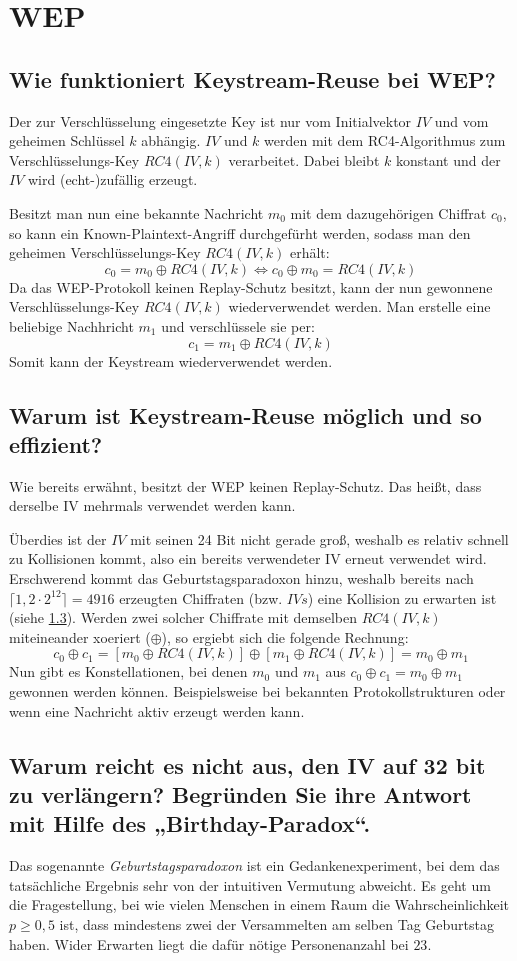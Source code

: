 \section{WEP}
\subsection{Wie funktioniert Keystream-Reuse bei WEP?}
Der zur Verschlüsselung eingesetzte Key ist nur vom Initialvektor $IV$ und vom geheimen Schlüssel $k$ abhängig. $IV$ und $k$ werden mit dem RC4-Algorithmus zum Verschlüsselungs-Key $RC4(IV,k)$ verarbeitet. Dabei bleibt $k$ konstant und der $IV$ wird (echt-)zufällig erzeugt.

Besitzt man nun eine bekannte Nachricht $m_0$ mit dem dazugehörigen Chiffrat $c_0$, so kann ein Known-Plaintext-Angriff durchgefürht werden, sodass man den geheimen Verschlüsselungs-Key $RC4(IV, k)$ erhält:
$$
c_0 = m_0 \oplus RC4(IV,k) \Leftrightarrow c_0 \oplus m_0 = RC4(IV,k)
$$
Da das WEP-Protokoll keinen Replay-Schutz besitzt, kann der nun gewonnene Verschlüsselungs-Key $RC4(IV,k)$ wiederverwendet werden. Man erstelle eine beliebige Nachhricht $m_1$ und verschlüssele sie per:
$$
c_1 = m_1 \oplus RC4(IV,k)
$$
Somit kann der Keystream wiederverwendet werden.

\subsection{Warum ist Keystream-Reuse möglich und so effizient?}
\label{sec:warum_effizient}
Wie bereits erwähnt, besitzt der WEP keinen Replay-Schutz. Das heißt, dass derselbe IV mehrmals verwendet werden kann.

Überdies ist der $IV$ mit seinen 24 Bit nicht gerade groß, weshalb es relativ schnell zu Kollisionen kommt, also ein bereits verwendeter IV erneut verwendet wird. Erschwerend kommt das Geburtstagsparadoxon hinzu, weshalb bereits nach $\lceil 1,2 \cdot 2^{12} \rceil = 4916$ erzeugten Chiffraten (bzw. $IVs$) eine Kollision zu erwarten ist (siehe \ref{sec:birthday_paradox}). Werden zwei solcher Chiffrate mit demselben $RC4(IV,k)$ miteineander xoeriert ($\oplus$), so ergiebt sich die folgende Rechnung:
$$
c_0 \oplus c_1 = [m_0 \oplus RC4(IV,k)] \oplus [m_1 \oplus RC4(IV,k)] = m_0 \oplus m_1
$$
Nun gibt es Konstellationen, bei denen $m_0$ und $m_1$ aus $c_0 \oplus c_1 = m_0 \oplus m_1$ gewonnen werden können. Beispielsweise bei bekannten Protokollstrukturen oder wenn eine Nachricht aktiv erzeugt werden kann.

\subsection{Warum reicht es nicht aus, den IV auf 32 bit zu verlängern? Begründen Sie ihre Antwort mit Hilfe des „Birthday-Paradox“.}
\label{sec:birthday_paradox}
Das sogenannte \textit{Geburtstagsparadoxon} ist ein Gedankenexperiment, bei dem das tatsächliche Ergebnis sehr von der intuitiven Vermutung abweicht. Es geht um die Fragestellung, bei wie vielen Menschen in einem Raum die Wahrscheinlichkeit $p\geq 0,5$ ist, dass mindestens zwei der Versammelten am selben Tag Geburtstag haben. Wider Erwarten liegt die dafür nötige Personenanzahl bei $23$.

